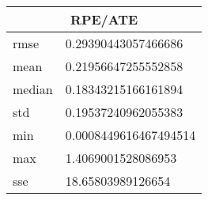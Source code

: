 \begin{table}[!ht] 
 \centering 
 \begin{tabular}{|l|l|} \hline 
 \multicolumn{2}{|c|}{RPE/ATE} \\ \hline 
 rmse & 0.29390443057466686 \\ \hline 
mean & 0.21956647255552858 \\ \hline 
median & 0.18343215166161894 \\ \hline 
std & 0.19537240962055383 \\ \hline 
min & 0.0008449616467494514 \\ \hline 
max & 1.4069001528086953 \\ \hline 
sse & 18.65803989126654 \\ \hline 
\end{tabular} 
 \end{table}